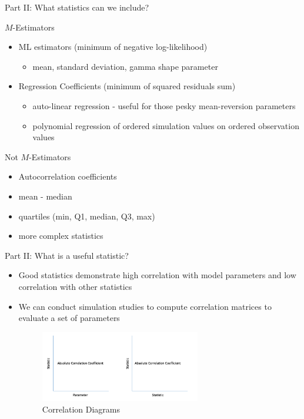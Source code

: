 \documentclass{beamer}
\begin{document}
\begin{frame}{Part II: What statistics can we include?}

\begin{block}{$M$-Estimators}
    \begin{itemize}
        \item ML estimators (minimum of negative log-likelihood)
        \begin{itemize}
            \item mean, standard deviation, gamma shape parameter
        \end{itemize}
        \item Regression Coefficients (minimum of squared residuals sum)
        \begin{itemize}
            \item auto-linear regression - useful for those pesky mean-reversion parameters
            \item polynomial regression of ordered simulation values on ordered observation values
        \end{itemize}
    \end{itemize}
\end{block}

\begin{block}{Not $M$-Estimators}
    \begin{itemize}
        \item Autocorrelation coefficients
        \item mean - median
        \item quartiles (min, Q1, median, Q3, max)
        \item more complex statistics
    \end{itemize}
\end{block}
    
\end{frame}

\begin{frame}{Part II: What is a useful statistic?}

\begin{itemize}
    \item Good statistics demonstrate high correlation with model parameters and low correlation with other statistics
    \item We can conduct simulation studies to compute correlation matrices to evaluate a set of parameters
    
    \begin{figure}[H]
        \centering
        \includegraphics[width=70mm]{corr_diags.png}
        \caption{Correlation Diagrams}
    \end{figure}
\end{itemize}
    
\end{frame}
\end{document}
